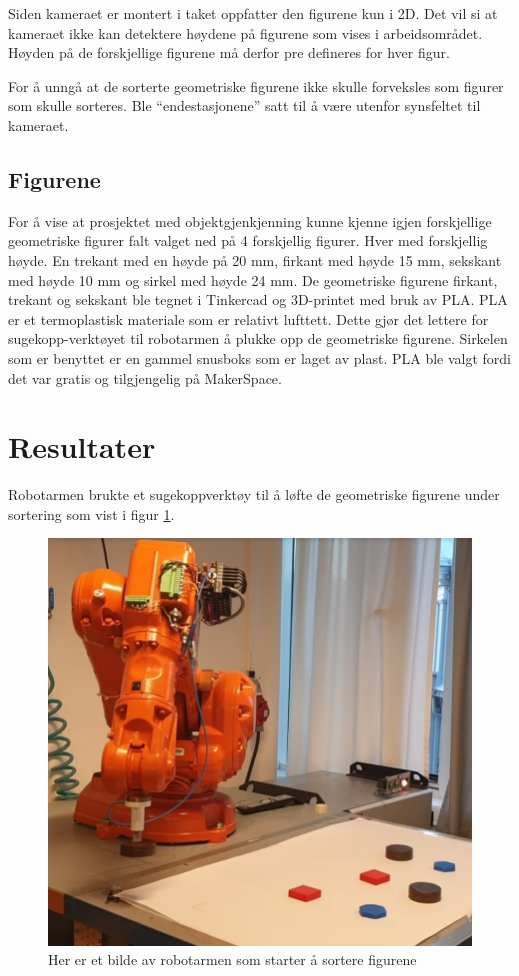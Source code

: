 \documentclass[conference]{IEEEtran}
\begin{document}

        Siden kameraet er montert i taket oppfatter den figurene kun i 2D. Det vil si at kameraet ikke kan detektere høydene på figurene som vises i arbeidsområdet. Høyden på de forskjellige figurene må derfor pre defineres for hver figur. 

        For å unngå at de sorterte geometriske figurene ikke skulle forveksles som figurer som skulle sorteres. Ble “endestasjonene” satt til å være utenfor synsfeltet til kameraet.

    \subsection{Figurene}
        For å vise at prosjektet med objektgjenkjenning kunne kjenne igjen forskjellige geometriske figurer falt valget ned på 4 forskjellig figurer. Hver med forskjellig høyde. En trekant med en høyde på 20 mm, firkant med høyde 15 mm, sekskant med høyde 10 mm og sirkel med høyde 24 mm. 
        De geometriske figurene firkant, trekant og sekskant ble tegnet i Tinkercad \cite{metode:tinkercad} og 3D-printet med bruk av PLA. PLA er et termoplastisk materiale som er relativt lufttett. Dette gjør det lettere for sugekopp-verktøyet til robotarmen å plukke opp de geometriske figurene. Sirkelen som er benyttet er en gammel snusboks som er laget av plast. PLA ble valgt fordi det var gratis og tilgjengelig på MakerSpace.

        
\section{Resultater}
    Robotarmen brukte et sugekoppverktøy til å løfte de geometriske figurene under sortering som vist i figur \ref{resultat:robotarm}.
    \begin{figure}[!htb]
        \centering
        \includegraphics[width=.8\linewidth]{images/robotarm1.png}
        \caption{Her er et bilde av robotarmen som starter å sortere figurene}
        \label{resultat:robotarm}
    \end{figure}
\end{document}
